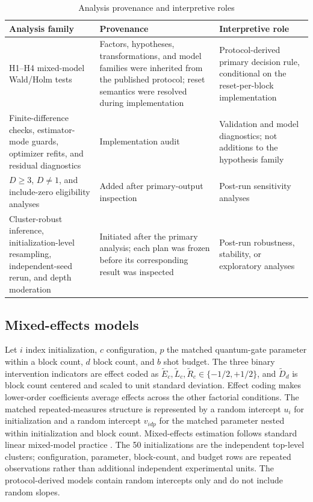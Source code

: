 \documentclass[pdflatex,sn-basic,Numbered]{sn-jnl}
\begin{document}
\begin{table}[t]
\centering
\small
\begin{tabularx}{\textwidth}{@{}p{}p{}X@{}}
\toprule
Analysis family & Provenance & Interpretive role \\
\midrule
H1--H4 mixed-model Wald/Holm tests & Factors, hypotheses, transformations, and model families were inherited from the published protocol; reset semantics were resolved during implementation & Protocol-derived primary decision rule, conditional on the reset-per-block implementation \\
Finite-difference checks, estimator-mode guards, optimizer refits, and residual diagnostics & Implementation audit & Validation and model diagnostics; not additions to the hypothesis family \\
$D\geq3$, $D\neq1$, and include-zero eligibility analyses & Added after primary-output inspection & Post-run sensitivity analyses \\
Cluster-robust inference, initialization-level resampling, independent-seed rerun, and depth moderation & Initiated after the primary analysis; each plan was frozen before its corresponding result was inspected & Post-run robustness, stability, or exploratory analyses \\
\bottomrule
\end{tabularx}
\caption{Analysis provenance and interpretive roles}
\label{tab:analysis-provenance}
\end{table}

\subsection{Mixed-effects models}

Let $i$ index initialization, $c$ configuration, $p$ the matched quantum-gate parameter within a block count, $d$ block count, and $b$ shot budget. The three binary intervention indicators are effect coded as $\widetilde E_c,\widetilde L_c,\widetilde R_c\in\{-1/2,+1/2\}$, and $\widetilde D_d$ is block count centered and scaled to unit standard deviation. Effect coding makes lower-order coefficients average effects across the other factorial conditions. The matched repeated-measures structure is represented by a random intercept $u_i$ for initialization and a random intercept $v_{idp}$ for the matched parameter nested within initialization and block count. Mixed-effects estimation follows standard linear mixed-model practice \cite{bates2015lme4}. The 50 initializations are the independent top-level clusters; configuration, parameter, block-count, and budget rows are repeated observations rather than additional independent experimental units. The protocol-derived models contain random intercepts only and do not include random slopes.
\end{document}
